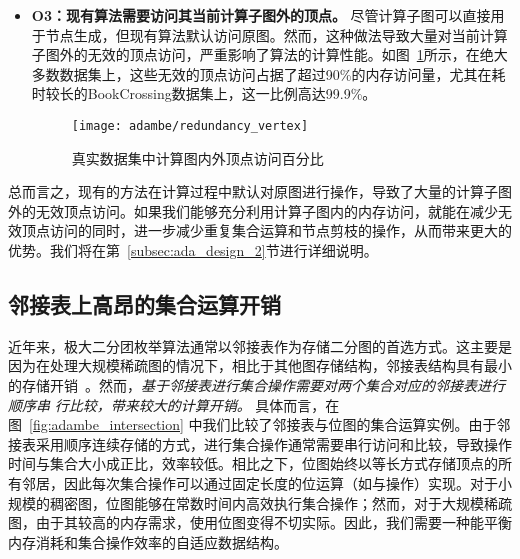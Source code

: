 \begin{itemize}
\item \textbf{O3：现有算法需要访问其当前计算子图外的顶点。} 尽管计算子图可以直接用于节点生成，但现有算法默认访问原图。然而，这种做法导致大量对当前计算子图外的无效的顶点访问，严重影响了算法的计算性能。如图~\ref{fig:ada_motivation_redundancy}所示，在绝大多数数据集上，这些无效的顶点访问占据了超过90\%的内存访问量，尤其在耗时较长的BookCrossing数据集上，这一比例高达99.9\%。

\begin{figure} [H]
	\centering
	\texttt{[image: adambe/redundancy\_vertex]}
	\caption{真实数据集中计算图内外顶点访问百分比  }
	\label{fig:ada_motivation_redundancy}
\end{figure}

\end{itemize}

总而言之，现有的方法在计算过程中默认对原图进行操作，导致了大量的计算子图外的无效顶点访问。如果我们能够充分利用计算子图内的内存访问，就能在减少无效顶点访问的同时，进一步减少重复集合运算和节点剪枝的操作，从而带来更大的优势。我们将在第~\ref{subsec:ada_design_2}节进行详细说明。


\subsection{邻接表上高昂的集合运算开销}

% 

近年来，极大二分团枚举算法通常以邻接表作为存储二分图的首选方式。这主要是因为在处理大规模稀疏图的情况下，相比于其他图存储结构，邻接表结构具有最小的存储开销~\cite{PMBE20,ooMBE22}。然而，\emph{基于邻接表进行集合操作需要对两个集合对应的邻接表进行顺序串} \emph{行比较，带来较大的计算开销。}
具体而言，在图~\ref{fig:adambe_intersection} 中我们比较了邻接表与位图的集合运算实例。由于邻接表采用顺序连续存储的方式，进行集合操作通常需要串行访问和比较，导致操作时间与集合大小成正比，效率较低。相比之下，位图始终以等长方式存储顶点的所有邻居，因此每次集合操作可以通过固定长度的位运算（如与操作）实现。对于小规模的稠密图，位图能够在常数时间内高效执行集合操作；然而，对于大规模稀疏图，由于其较高的内存需求，使用位图变得不切实际。因此，我们需要一种能平衡内存消耗和集合操作效率的自适应数据结构。


